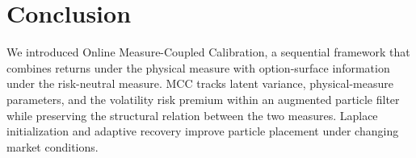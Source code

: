\documentclass[sigconf,anonymous,review]{acmart}
\begin{document}



\section{Conclusion}
We introduced Online Measure-Coupled Calibration, a sequential framework
that combines returns under the physical measure with option-surface
information under the risk-neutral measure. MCC tracks latent variance,
physical-measure parameters, and the volatility risk premium within an
augmented particle filter while preserving the structural relation
between the two measures. Laplace initialization and adaptive recovery
improve particle placement under changing market conditions.
\end{document}
